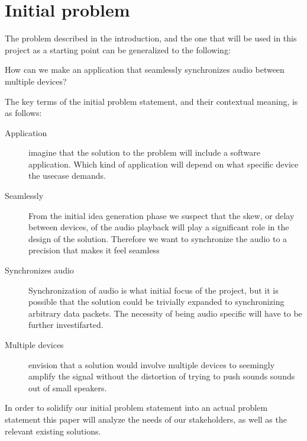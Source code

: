 \section{Initial problem}

The problem described in the introduction, and the one that will be used
in this project as a starting point can be generalized to the following:

\begin{problemstatement}
	How can we make an application that seamlessly synchronizes audio
	between multiple  devices?
\end{problemstatement}

The key terms of the initial problem statement, and their contextual meaning,
is as follows:
\begin{description}
	\item[Application] 
		imagine that the solution to the problem will include a software
		application. Which kind of application will depend on what specific
		device the usecase demands.
	\item[Seamlessly] From the initial idea generation phase we suspect
		that the skew, or delay between devices, of the audio playback will
		play a significant role in the design of the solution. Therefore we
		want to synchronize the audio to a precision that makes it feel
		seamless
	\item[Synchronizes audio] Synchronization of audio is what initial focus of
		the project, but it is possible that the solution could be trivially
		expanded to synchronizing arbitrary data packets. The necessity of
		being audio specific will have to be further investifarted.
	\item[Multiple devices]  envision that
		a solution would involve multiple devices to seemingly amplify the
		signal without the distortion of trying to push sounds sounds out of
		small speakers.
\end{description}

In order to solidify our initial problem statement into an actual problem
statement this paper will analyze the needs of our stakeholders, as well as the
relevant existing solutions.
